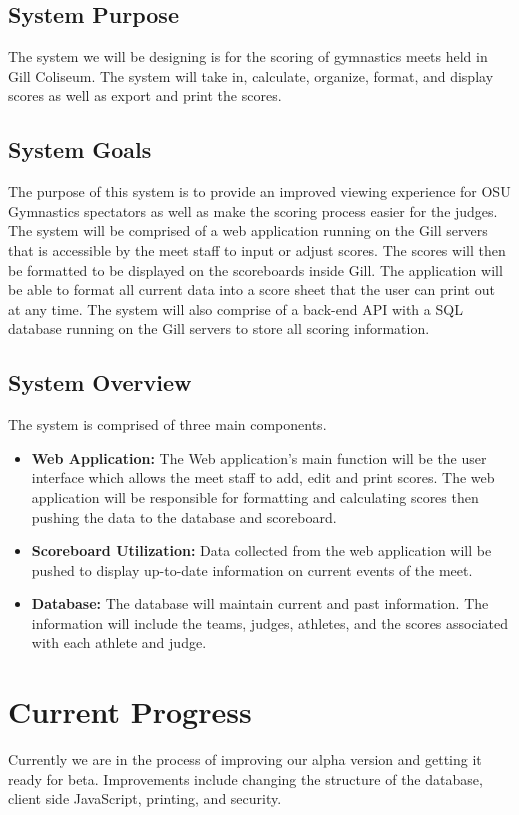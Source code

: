 \documentclass[letterpaper,10pt,draftclsnofoot,onecolumn,]{article}
\begin{document}
\subsection{System Purpose}
The system we will be designing is for the scoring of gymnastics meets held in Gill Coliseum. The system will take in, calculate, organize, format, and display scores as well as export and print the scores.

\subsection{System Goals}
The purpose of this system is to provide an improved viewing experience for OSU Gymnastics spectators as well as make the scoring process easier for the judges. The system will be comprised of a web application running on the Gill servers that is accessible by the meet staff to input or adjust scores. The scores will then be formatted to be displayed on the scoreboards inside Gill. The application will be able to format all current data into a score sheet that the user can print out at any time. The system will also comprise of a back-end API with a SQL database running on the Gill servers to store all scoring information.

\subsection{System Overview}
The system is comprised of three main components.
\begin{itemize}
    \item \textbf{Web Application:}
          The Web application's main function will be the user interface which allows the meet staff to add, edit and print scores. The web application will be responsible for formatting and calculating scores then pushing the data to the database and scoreboard.
    \item \textbf{Scoreboard Utilization:}
          Data collected from the web application will be pushed to display up-to-date information on current events of the meet.
    \item \textbf{Database:}
          The database will maintain current and past information. The information will include the teams, judges, athletes, and the scores associated with each athlete and judge.
\end{itemize}

\section{Current Progress}
Currently we are in the process of improving our alpha version and getting it ready for beta. Improvements include changing the structure of the database, client side JavaScript, printing, and security.
\end{document}
